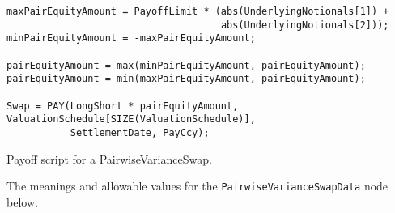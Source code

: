 \begin{listing}[hbt]
\begin{verbatim}
maxPairEquityAmount = PayoffLimit * (abs(UnderlyingNotionals[1]) +
                                     abs(UnderlyingNotionals[2]));
minPairEquityAmount = -maxPairEquityAmount;

pairEquityAmount = max(minPairEquityAmount, pairEquityAmount);
pairEquityAmount = min(maxPairEquityAmount, pairEquityAmount);

Swap = PAY(LongShort * pairEquityAmount, ValuationSchedule[SIZE(ValuationSchedule)],
           SettlementDate, PayCcy);
\end{verbatim}
\caption{Payoff script for a PairwiseVarianceSwap.}
\label{lst:pairwise_variance_swap}
\end{listing}

The meanings and allowable values for the \lstinline!PairwiseVarianceSwapData! node below.

